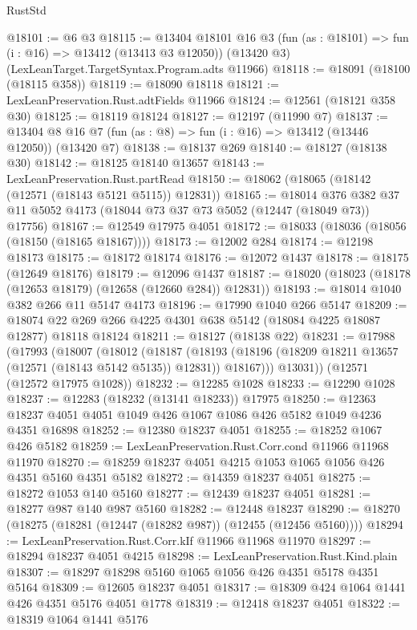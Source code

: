 \begin{lexlean}{RustStd}
\begin{coremodule}
@18101 := @6 @3
@18115 := @13404
    @18101
    @16
    @3
    (fun (as : @18101) => fun (i : @16) => @13412 (@13413 @3 @12050))
    (@13420 @3)
    (LexLeanTarget.TargetSyntax.Program.adts @11966)
@18118 := @18091 (@18100 (@18115 @358))
@18119 := @18090 @18118
@18121 := LexLeanPreservation.Rust.adtFields @11966
@18124 := @12561 (@18121 @358 @30)
@18125 := @18119 @18124
@18127 := @12197 (@11990 @7)
@18137 := @13404 @8 @16 @7 (fun (as : @8) => fun (i : @16) => @13412 (@13446 @12050)) (@13420 @7)
@18138 := @18137 @269
@18140 := @18127 (@18138 @30)
@18142 := @18125 @18140 @13657
@18143 := LexLeanPreservation.Rust.partRead
@18150 := @18062 (@18065 (@18142 (@12571 (@18143 @5121 @5115)) @12831))
@18165 := @18014
    @376
    @382
    @37
    @11
    @5052
    @4173
    (@18044 @73 @37 @73 @5052 (@12447 (@18049 @73)) @17756)
@18167 := @12549 @17975 @4051
@18172 := @18033 (@18036 (@18056 (@18150 (@18165 @18167))))
@18173 := @12002 @284
@18174 := @12198 @18173
@18175 := @18172 @18174
@18176 := @12072 @1437
@18178 := @18175 (@12649 @18176)
@18179 := @12096 @1437
@18187 := @18020 (@18023 (@18178 (@12653 @18179) (@12658 (@12660 @284)) @12831))
@18193 := @18014 @1040 @382 @266 @11 @5147 @4173
@18196 := @17990 @1040 @266 @5147
@18209 := @18074 @22 @269 @266 @4225 @4301 @638 @5142 (@18084 @4225 @18087 @12877) @18118 @18124
@18211 := @18127 (@18138 @22)
@18231 := @17988
    (@17993
      (@18007
        (@18012
          (@18187
            (@18193 (@18196 (@18209 @18211 @13657 (@12571 (@18143 @5142 @5135)) @12831)) @18167)))
        @13031))
    (@12571 (@12572 @17975 @1028))
@18232 := @12285 @1028
@18233 := @12290 @1028
@18237 := @12283 (@18232 (@13141 @18233)) @17975
@18250 := @12363 @18237 @4051 @4051 @1049 @426 @1067 @1086 @426 @5182 @1049 @4236 @4351 @16898
@18252 := @12380 @18237 @4051
@18255 := @18252 @1067 @426 @5182
@18259 := LexLeanPreservation.Rust.Corr.cond @11966 @11968 @11970
@18270 := @18259 @18237 @4051 @4215 @1053 @1065 @1056 @426 @4351 @5160 @4351 @5182
@18272 := @14359 @18237 @4051
@18275 := @18272 @1053 @140 @5160
@18277 := @12439 @18237 @4051
@18281 := @18277 @987 @140 @987 @5160
@18282 := @12448 @18237
@18290 := @18270 (@18275 (@18281 (@12447 (@18282 @987)) (@12455 (@12456 @5160))))
@18294 := LexLeanPreservation.Rust.Corr.kIf @11966 @11968 @11970
@18297 := @18294 @18237 @4051 @4215
@18298 := LexLeanPreservation.Rust.Kind.plain
@18307 := @18297 @18298 @5160 @1065 @1056 @426 @4351 @5178 @4351 @5164
@18309 := @12605 @18237 @4051
@18317 := @18309 @424 @1064 @1441 @426 @4351 @5176 @4051 @1778
@18319 := @12418 @18237 @4051
@18322 := @18319 @1064 @1441 @5176

\end{coremodule}
\end{lexlean}
